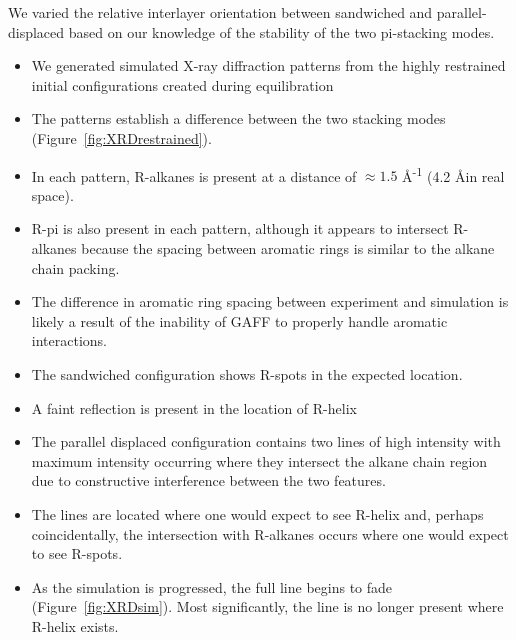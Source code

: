\documentclass{article}
\newcommand{\angstrom}{\textup{\AA}}
\begin{document}
  We varied the relative interlayer orientation between sandwiched and 
  parallel-displaced based on our knowledge of the stability of the two
  pi-stacking modes.
  \begin{itemize}
  	\item We generated simulated X-ray diffraction patterns from the highly
	restrained initial configurations created during equilibration
	\item The patterns establish a difference between the two stacking 
	modes (Figure~\ref{fig:XRDrestrained}).
	\item In each pattern, R-alkanes is present at a distance of $\approx
	1.5$ \angstrom \textsuperscript{-1} (4.2 \angstrom in real space).
  	\item R-pi is also present in each pattern, although it appears to 
	intersect R-alkanes because the spacing between aromatic rings is 
	similar to the alkane chain packing.
	\item The difference in aromatic ring spacing between experiment and
	simulation is likely a result of the inability of GAFF to properly handle
	aromatic interactions.
	\item The sandwiched configuration shows R-spots in the expected location.
	\item A faint reflection is present in the location of R-helix %
	\item The parallel displaced configuration contains two lines of high 
	intensity with maximum intensity occurring where they intersect the alkane
	chain region due to constructive interference between the two features.
	\item The lines are located where one would expect to see R-helix and, 
	perhaps coincidentally, the intersection with R-alkanes occurs where one 
	would expect to see R-spots.
	\item As the simulation is progressed, the full line begins to fade 
	(Figure~\ref{fig:XRDsim}). Most significantly, the line is no longer present
	where R-helix exists.
  \end{itemize}
\end{document}
